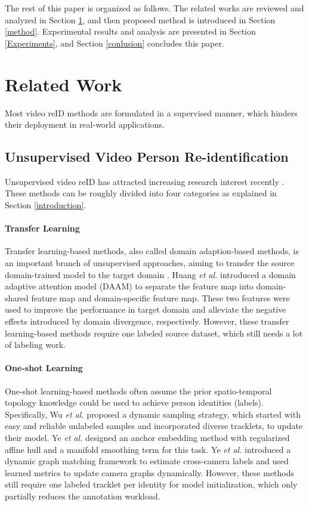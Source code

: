 \documentclass{cta-author}
\begin{document}
	The rest of this paper is organized as follows. The related works are reviewed and analyzed in Section \ref{related work}, and then proposed method is introduced in Section \ref{method}. Experimental results and analysis are presented in Section \ref{Experiments}, and Section \ref{conlusion} concludes this paper.
	
	\section{Related Work}\label{related work}
	Most video reID methods are formulated in a supervised manner, which hinders their deployment in real-world applications.  
	
	\subsection{Unsupervised Video Person Re-identification}
	Unsupervised video reID has attracted increasing research interest recently \cite{RN96} \cite{RN370} \cite{RN309} \cite{RN357}. These methods can be roughly divided into four categories as explained in Section \ref{introduction}. 
	
	\paragraph{Transfer Learning}
	Transfer learning-based methods, also called domain adaption-based methods, is an important branch of unsupervised approaches, aiming to transfer the source domain-trained model to the target domain \cite{RN104} \cite{RN221}. Huang \textit{et al.} \cite{RN359} introduced a domain adaptive attention model (DAAM) to separate the feature map into domain-shared feature map and domain-specific feature map. These two features were used to improve the performance in target domain and alleviate the negative effects introduced by domain divergence, respectively. However, these transfer learning-based methods require one labeled source dataset, which still needs a lot of labeling work.
	
	\paragraph{One-shot Learning}
	One-shot learning-based methods \cite{RN107} \cite{RN95} often assume the prior spatio-temporal topology knowledge could be used to achieve person identities (labels). Specifically, Wu \textit{et al.} \cite{RN391} proposed a dynamic sampling strategy, which started with easy and reliable unlabeled samples and incorporated diverse tracklets, to update their model. Ye \textit{et al.} \cite{RN107} designed an anchor embedding method with regularized affine hull and a manifold smoothing term for this task. Ye \textit{et al.} \cite{RN95} introduced a dynamic graph matching framework to estimate cross-camera labels and used learned metrics to update camera graphs dynamically. However, these methods still require one labeled tracklet per identity for model initialization, which only partially reduces the annotation workload.
	
\end{document}
